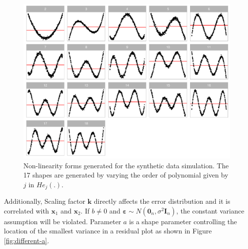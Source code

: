 \documentclass[]{interact}
\theoremstyle{plain}%
\theoremstyle{definition}
\theoremstyle{remark}
\begin{document}
\begin{figure}[!h]

{\centering \includegraphics[width=1\linewidth]{paper_files/figure-latex/different-j-1} 

}

\caption{Non-linearity forms generated for the synthetic data simulation. The 17 shapes are generated by varying the order of polynomial given by $j$ in $He_j(.)$.}\label{fig:different-j}
\end{figure}

Additionally, Scaling factor \(\boldsymbol{k}\) directly affects the
error distribution and it is correlated with \(\boldsymbol{x}_1\) and
\(\boldsymbol{x}_2\). If \(b \neq 0\) and
\(\boldsymbol{\varepsilon} \sim N(\boldsymbol{0}_n, \sigma^2\boldsymbol{I}_n)\),
the constant variance assumption will be violated. Parameter \(a\) is a
shape parameter controlling the location of the smallest variance in a
residual plot as shown in Figure \ref{fig:different-a}.
\end{document}
